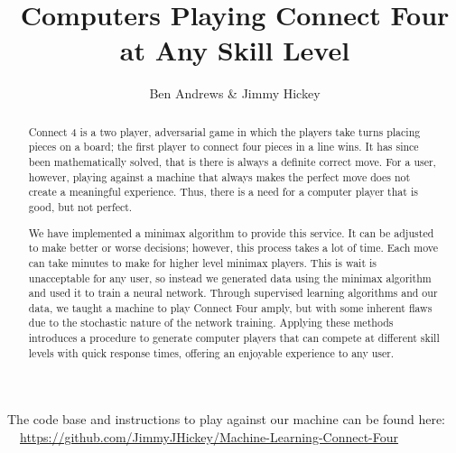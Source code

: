 \documentclass[12pt]{article}
\title{Computers Playing Connect Four at Any Skill Level}
\author{Ben Andrews \& Jimmy Hickey}
\begin{document}
	\maketitle
		\doublespacing
\begin{abstract}

	Connect 4 is a two player, adversarial game in which the players take turns placing pieces on a board; the first player to connect four pieces in a line wins. It has since been mathematically solved, that is there is always a definite correct move. For a user, however, playing against a machine that always makes the perfect move does not create a meaningful experience. Thus, there is a need for a computer player that is good, but not perfect. 
	
	We have implemented a minimax algorithm to provide this service. It can be adjusted to make better or worse decisions; however, this process takes a lot of time. Each move can take minutes to make for higher level minimax players. This is wait is unacceptable for any user, so instead we generated data using the minimax algorithm and used it to train a neural network.
Through supervised learning algorithms and our data, we taught a machine to play Connect Four amply, but with some inherent flaws due to the stochastic nature of the network training. Applying these methods introduces a procedure to generate computer players that can compete at different skill levels with quick response times, offering an enjoyable experience to any user.
\end{abstract}
The code base and instructions to play against our machine can be found here: \\
\faGithub \ \  \href{https://github.com/JimmyJHickey/Machine-Learning-Connect-Four}{https://github.com/JimmyJHickey/Machine-Learning-Connect-Four}
\end{document}
